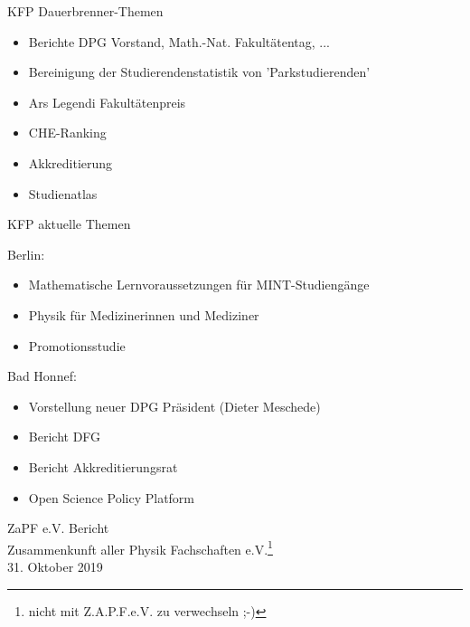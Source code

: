 \documentclass[compress, aspectratio=169]{beamer}
\begin{document}
 
 \begin{frame}{KFP Dauerbrenner-Themen}
  \begin{itemize}
   \item Berichte DPG Vorstand, Math.-Nat. Fakultätentag, ... 
   \item Bereinigung der Studierendenstatistik von 'Parkstudierenden'
   \item Ars Legendi Fakultätenpreis
   \item CHE-Ranking
   \item Akkreditierung
   \item Studienatlas
  \end{itemize}
 \end{frame}
 
 
 \begin{frame}{KFP aktuelle Themen}
 
  Berlin:
  \begin{itemize}
   \item Mathematische Lernvoraussetzungen für MINT-Studiengänge
   \item Physik für Medizinerinnen und Mediziner
   \item Promotionsstudie
  \end{itemize}
  
  \bigskip
  
  Bad Honnef:
  \begin{itemize}
   \item Vorstellung neuer DPG Präsident (Dieter Meschede)
   \item Bericht DFG 
   \item Bericht Akkreditierungsrat 
   \item Open Science Policy Platform 
  \end{itemize}
 \end{frame}


\thispagestyle{empty}
\begin{frame}
  \begin{center}
    \Large{ ZaPF e.V. Bericht }\\
    \vspace{1cm}
    \large Zusammenkunft aller Physik Fachschaften e.V.\footnote{nicht mit Z.A.P.F.e.V. zu verwechseln ;-)}\\
    \vspace{0.5cm}
    \normalsize 31. Oktober 2019
  \end{center}
\end{frame}
\end{document}
